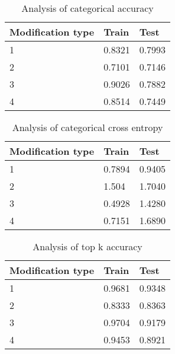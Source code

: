 \begin{table}[h]
	\centering
	\caption{Analysis of categorical accuracy}
	\label{my-label}
	\begin{tabular}{| p{3cm} | p{3cm} | p{3cm} |}
		\hline
		\textbf{Modification type}  & \textbf{Train} & \textbf{Test}                                                    
		\\ \hline
		1   &  0.8321 & 0.7993
		\\ \hline
		2   &  0.7101 & 0.7146 
		\\ \hline
		3   &  0.9026 & 0.7882
		\\ \hline		
		4   &  0.8514 & 0.7449
		\\ \hline
	\end{tabular}
\end{table}

\begin{table}[h]
	\centering
	\caption{Analysis of categorical cross entropy}
	\label{my-label}
	\begin{tabular}{| p{3cm} | p{3cm} | p{3cm} |}
		\hline
		\textbf{Modification type}  & \textbf{Train} & \textbf{Test}                                                    
		\\ \hline
		1   &  0.7894 & 0.9405
		\\ \hline
		2   &   1.504 &  1.7040
		\\ \hline
		3   &  0.4928 & 1.4280
		\\ \hline		
		4   &  0.7151 & 1.6890
		\\ \hline
	\end{tabular}
\end{table}

\begin{table}[h]
	\centering
	\caption{Analysis of top k accuracy}
	\label{my-label}
	\begin{tabular}{| p{3cm} | p{3cm} | p{3cm} |}
		\hline
		\textbf{Modification type}  & \textbf{Train} & \textbf{Test}                                                    
		\\ \hline
		1   &  0.9681 & 0.9348
		\\ \hline
		2  &   0.8333 & 0.8363
		\\ \hline
		3   &  0.9704 & 0.9179
		\\ \hline		
		4   &  0.9453 & 0.8921
		\\ \hline
	\end{tabular}
\end{table}

